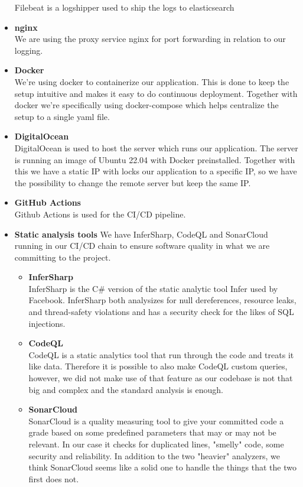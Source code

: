 \documentclass{article}
\begin{document}
\begin{itemize}
    Filebeat is a logshipper used to ship the logs to elasticsearch
    \item \textbf{nginx} \cite{nginx}\\
    We are using the proxy service nginx for port forwarding in relation to our logging.
    \item \textbf{Docker} \cite{docker}\\
    We're using docker to containerize our application. This is done to keep the setup intuitive and makes it easy to do continuous deployment. Together with docker we're specifically using docker-compose which helps centralize the setup to a single yaml file.
    \item \textbf{DigitalOcean} \cite{digitalocean}\\
    DigitalOcean is used to host the server which runs our application. The server is running an image of Ubuntu 22.04 with Docker preinstalled. Together with this we have a static IP with locks our application to a specific IP, so we have the possibility to change the remote server but keep the same IP.
    \item \textbf{GitHub Actions} \cite{ghactions}\\
    Github Actions is used for the CI/CD pipeline.
    \item \textbf{Static analysis tools}
    We have InferSharp, CodeQL and SonarCloud running in our CI/CD chain to ensure software quality in what we are committing to the project.
    \begin{itemize}
        \item \textbf{InferSharp} \cite{infersharp}\\
        InferSharp is the C\# version of the static analytic tool Infer used by Facebook. InferSharp both analysizes for null dereferences, resource leaks, and thread-safety violations and has a security check for the likes of SQL injections.
        \item \textbf{CodeQL} \cite{codeql}\\
        CodeQL is a static analytics tool that run through the code and treats it like data. Therefore it is possible to also make CodeQL custom queries, however, we did not make use of that feature as our codebase is not that big and complex and the standard analysis is enough.
        \item \textbf{SonarCloud} \cite{sonarcloud}\\
        SonarCloud is a quality measuring tool to give your committed code a grade based on some predefined parameters that may or may not be relevant. In our case it checks for duplicated lines, "smelly" code, some security and reliability. In addition to the two "heavier" analyzers, we think SonarCloud seems like a solid one to handle the things that the two first does not.
    \end{itemize}
\end{itemize}
\end{document}
